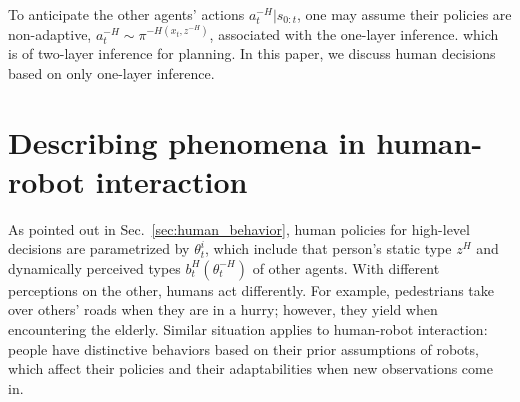 \documentclass[letterpaper, 10 pt, conference]{ieeeconf}  %
\begin{document}
To anticipate the other agents' actions $a^{-H}_{t}|s_{0:t}$, one may assume 
their policies are non-adaptive, $a^{-H}_t \sim \pi^{-H(x_t,z^{-H})}$, 
associated with the one-layer inference.
which is of two-layer inference for planning. In this paper, we discuss human 
decisions based on only one-layer inference.


\section{Describing phenomena in human-robot interaction}
As pointed out in Sec.~\ref{sec:human_behavior}, human policies for high-level 
decisions are parametrized by $\theta^i_t$, which include that person's static 
type $z^H$ and dynamically perceived types $b^H_t(\theta^{-H}_t)$ of other 
agents. With different perceptions on the other, humans act 
differently. For example, pedestrians take over others' roads when they are in 
a hurry; however, they yield when encountering the elderly. Similar situation 
applies to human-robot interaction: people have distinctive behaviors based on 
their prior assumptions of robots, which affect their policies and their 
adaptabilities when new observations come in.
\end{document}
